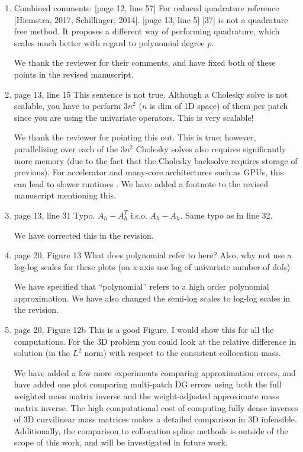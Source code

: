 \documentclass[10pt]{article}
\newcommand{\note}[1]{{\color{violet}#1}}
\begin{document}
\begin{enumerate}
\begin{enumerate}
\item Combined comments: [page 12, line 57]     For reduced quadrature reference [Hiemstra, 2017, Schillinger, 2014].  [page 13, line 5]                 [37] is not a quadrature free method.  It proposes a different way of performing quadrature, which scales much better with regard to polynomial degree $p$.  

\note{We thank the reviewer for their comments, and have fixed both of these points in the revised manuscript.}

\item page 13, line 15                This sentence is not true. Although a Cholesky solve is not scalable, you have to perform $3n^2$ ($n$ is dim of 1D space) of them per patch since you are using the univariate operators. This is very scalable!  

\note{We thank the reviewer for pointing this out.  This is true; however, parallelizing over each of the $3n^2$ Cholesky solves also requires significantly more memory (due to the fact that the Cholesky backsolve requires storage of previous).  For accelerator and many-core architectures such as GPUs, this can lead to slower runtimes \cite{chan2017weight}.  We have added a footnote to the revised manuscript mentioning this.  }

\item page 13, line 31                Typo. $A_h - A_h^T$ i.s.o. $A_h - A_h$. Same typo as in line 32.

\note{We have corrected this in the revision.}

\item page 20, Figure 13           What does polynomial refer to here? Also, why not use a log-log scales for these plots (on x-axis use log of univariate number of dofs)

\note{We have specified that ``polynomial'' refers to a high order polynomial approximation.  We have also changed the semi-log scales to log-log scales in the revision.}

\item page 20, Figure 12b         This is a good Figure. I would show this for all the computations. For the 3D problem you could look at the relative difference in solution (in the $L^2$ norm) with respect to the consistent collocation mass.  

\note{We have added a few more experiments comparing approximation errors, and have added one plot comparing multi-patch DG errors using both the full weighted mass matrix inverse and the weight-adjusted approximate mass matrix inverse.  The high computational cost of computing fully dense inverses of 3D curvilinear mass matrices makes a detailed comparison in 3D infeasible.  Additionally, the comparison to collocation spline methods is outside of the scope of this work, and will be investigated in future work. }


\end{enumerate}
\end{enumerate}
\end{document}
